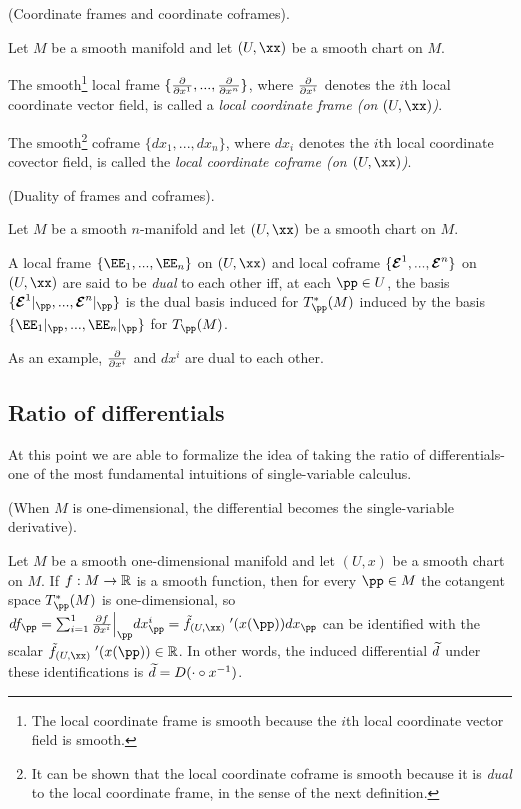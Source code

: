 \begin{defn}
\label{ch::manifolds::defn::coordinate_frames_coframes}
     (Coordinate frames and coordinate coframes).
    
    Let $M$ be a smooth manifold and let $(U, \xx)$ be a smooth chart on $M$.
    
    The smooth\footnote{The local coordinate frame is smooth because the $i$th local coordinate vector field is smooth.} local frame $\{\frac{\partial}{\partial x^1}, ..., \frac{\partial}{\partial x^n} \}$, where $\frac{\partial}{\partial x^i}$ denotes the $i$th local coordinate vector field, is called a \textit{local coordinate frame (on $(U, \xx)$)}.
    
    The smooth\footnote{It can be shown that the local coordinate coframe is smooth because it is \textit{dual} to the local coordinate frame, in the sense of the next definition.} coframe $\{dx_1, ..., dx_n\}$, where $dx_i$ denotes the $i$th local coordinate covector field, is called the \textit{local coordinate coframe (on $(U, \xx)$)}.
\end{defn}

\begin{defn}
     (Duality of frames and coframes).

    Let $M$ be a smooth $n$-manifold and let $(U, \xx)$ be a smooth chart on $M$.
    
    A local frame $\{\EE_1, ..., \EE_n\}$ on $(U, \xx)$ and local coframe $\{\boldsymbol{\mathcal{E}}^1, ..., \boldsymbol{\mathcal{E}}^n\}$ on $(U, \xx)$ are said to be \textit{dual} to each other iff, at each $\pp \in U$, the basis $\{\EEE^1|_\pp, ..., \EEE^n|_\pp\}$ is the dual basis induced for $T_\pp^*(M)$ induced by the basis $\{\EE_1|_\pp, ..., \EE_n|_\pp\}$ for $T_\pp(M)$. 
    
    As an example, $\frac{\partial}{\partial x^i}$ and $dx^i$ are dual to each other.
\end{defn}

\subsection*{Ratio of differentials}

At this point we are able to formalize the idea of taking the ratio of differentials- one of the most fundamental intuitions of single-variable calculus.

\newcommand{\tfUxPrime}{\tilde{f}_{(U, \xx)}\phantom{'}'}
\newcommand{\tfPrime}{\tilde{f}\phantom{'}'}

\begin{lemma}
    (When $M$ is one-dimensional, the differential becomes the single-variable derivative).

    Let $M$ be a smooth one-dimensional manifold and let $(U, x)$ be a smooth chart on $M$. If ${f:M \rightarrow \mathbb{R}}$ is a smooth function, then for every $\pp \in M$ the cotangent space $T_\pp^*(M)$ is one-dimensional, so $df_\pp = \sum_{i = 1}^1 \frac{\pd f}{\pd x^i}\Big|_\pp dx^i_\pp = \tfUxPrime(x(\pp))    dx_\pp$ can be identified with the scalar $\tfUxPrime(x(\pp)) \in \R$. In other words, the induced differential $\widetilde{d}$ under these identifications is $\widetilde{d} = D(\cdot \circ x^{-1})$.
\end{lemma}

